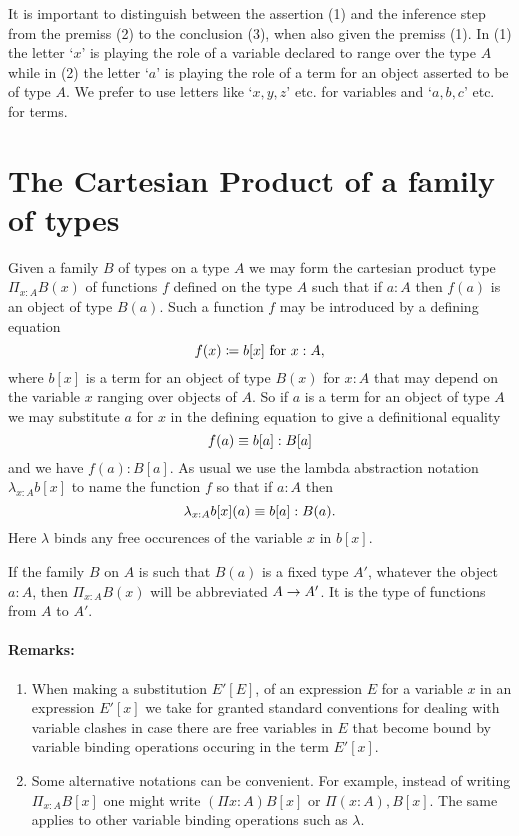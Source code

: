 {It is important to distinguish between the assertion (1) and the inference step from the premiss (2) to the conclusion (3), when also given the premiss (1).  In (1) the letter `$x$' is playing the role of a variable declared to range over the type $A$ while in (2) the letter `$a$' is playing the role of a term for an object asserted to be of type $A$.  We prefer to use letters like `$x,y,z$' etc. for variables and `$a,b,c$' etc. for terms.

\section{The Cartesian Product of a family of types}
  Given a family $B$ of types on a type $A$ we may form the cartesian product type $\Pi_{x:A}B(x)$
of functions $f$ defined on the type $A$ such that if $a:A$ then $f(a)$ is an object of type $B(a)$.  Such a function $f$ may be introduced by a defining equation
  \[ f(x)\coloneqq b[x]\mbox{ for } x:A,\]
where $b[x]$ is a term for an object of type $B(x)$ for $x:A$ that may depend on the variable $x$ ranging over objects of $A$.  So if $a$ is a term for an object of type $A$ we may substitute $a$ for $x$ in the defining equation to give a definitional equality
  \[ f(a)\equiv b[a]:B[a]\]
and we have $f(a):B[a]$.  As usual we use the lambda abstraction notation 
$\lambda_{x:A}b[x]$ to name the function $f$ so that if $a:A$ then
  \[\lambda_{x:A}b[x](a)\equiv b[a]: B(a).\]
Here $\lambda$ binds any free occurences of the variable $x$ in $b[x]$.

If the family $B$ on $A$ is such that $B(a)$ is a fixed type $A'$, whatever the object $a:A$, then $\Pi_{x:A}B(x)$ will be abbreviated $A\rightarrow A'$.  It is the type of functions from $A$ to $A'$.


\paragraph{Remarks:}
\begin{enumerate}
\item When making a substitution $E'[E]$, of an expression $E$ for a variable $x$ in an expression $E'[x]$ we take for granted standard conventions for dealing with variable clashes in case there are free variables in $E$ that become bound by variable binding operations occuring in the term $E'[x]$.

\item Some alternative notations can be convenient.  For example, instead of writing $\Pi_{x:A}B[x]$ one might write $(\Pi x:A)B[x]$ or $\Pi (x:A),B[x]$.  The same applies to other variable binding operations such as $\lambda$.


\end{enumerate}}
